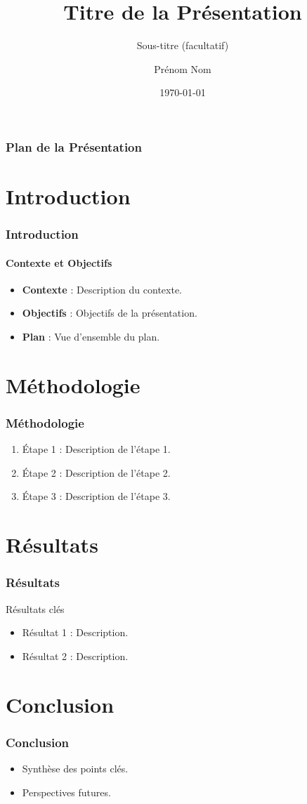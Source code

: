 \documentclass{beamer} %
\title{Titre de la Présentation}
\subtitle{Sous-titre (facultatif)}
\author{Prénom Nom}
\institute{Nom de l'Établissement}
\date{\today}
\begin{document}
\begin{frame}
    \titlepage
\end{frame}

\begin{frame}
    \frametitle{Plan de la Présentation}
    \tableofcontents %
\end{frame}

\section{Introduction}
\begin{frame}
    \frametitle{Introduction}
    \framesubtitle{Contexte et Objectifs}
    \begin{itemize}
        \item<1-> \textbf{Contexte} : Description du contexte.
        \item<2-> \textbf{Objectifs} : Objectifs de la présentation.
        \item<3-> \textbf{Plan} : Vue d'ensemble du plan.
    \end{itemize}
\end{frame}

\section{Méthodologie}
\begin{frame}
    \frametitle{Méthodologie}
    \begin{enumerate}
        \item Étape 1 : Description de l'étape 1.
        \item Étape 2 : Description de l'étape 2.
        \item Étape 3 : Description de l'étape 3.
    \end{enumerate}
\end{frame}

\section{Résultats}
\begin{frame}
    \frametitle{Résultats}
    \begin{block}{Résultats clés}
        \begin{itemize}
            \item Résultat 1 : Description.
            \item Résultat 2 : Description.
        \end{itemize}
    \end{block}
\end{frame}

\section{Conclusion}
\begin{frame}
    \frametitle{Conclusion}
    \begin{itemize}
        \item Synthèse des points clés.
        \item Perspectives futures.
    \end{itemize}
\end{frame}
\end{document}
